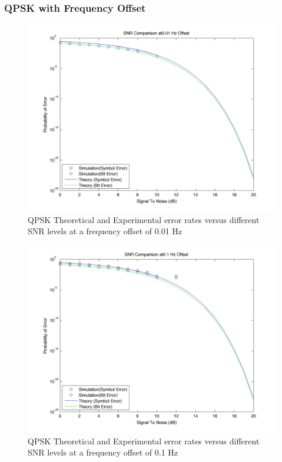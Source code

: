 \documentclass[]{article}
\begin{document}
\subsubsection{QPSK with Frequency Offset}
\begin{figure}[H]
\centering
\hspace*{-2cm}\includegraphics[width=1.3\textwidth]{qpSNRfo1.jpg}
\caption{QPSK Theoretical and Experimental error rates versus different SNR levels at a frequency offset of 0.01 Hz}
\end{figure}

\begin{figure}[H]
\centering
\hspace*{-2cm}\includegraphics[width=1.3\textwidth]{qpSNRfo2.jpg}
\caption{QPSK Theoretical and Experimental error rates versus different SNR levels at a frequency offset of 0.1 Hz}
\end{figure}
\end{document}

